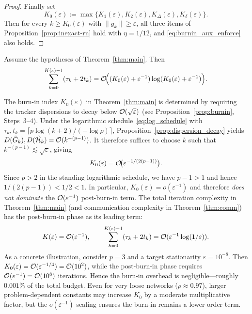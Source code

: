 \documentclass[review,onefignum,onetabnum]{siamart171218}
\begin{document}
\begin{proof}
\smallskip
Finally set
\[
K_0(\varepsilon):=\max\{K_1(\varepsilon),K_2(\varepsilon),K_\Delta(\varepsilon),K_\delta(\varepsilon)\}.
\]
Then for every $k\ge K_0(\varepsilon)$ with $\|g_k\|\ge \varepsilon$, all three items of Proposition~\ref{prop:inexact-rn} hold with $\eta=1/12$,
and \eqref{eq:burnin_aux_enforce} also holds.
\end{proof}

\begin{theorem}\label{thm:comm}
Assume the hypotheses of Theorem~\ref{thm:main}. Then
\[
\sum_{k=0}^{K(\varepsilon)-1}(\tau_k+2t_k)
=\mathcal{O}\!\Big((K_0(\varepsilon)+\varepsilon^{-1})\log(K_0(\varepsilon)+\varepsilon^{-1})\Big).
\]
\end{theorem}

\begin{remark}\label{rem:burnin_order_app}
The burn-in index $K_0(\varepsilon)$ in Theorem~\ref{thm:main} is
determined by requiring the tracker dispersions to decay below
$\mathcal{O}(\sqrt\varepsilon)$ (see Proposition~\ref{prop:burnin}, Steps~3--4).
Under the logarithmic schedule~\eqref{eq:log_schedule} with
$\tau_k,t_k=\lceil p\log(k+2)/(-\log\rho)\rceil$,
Proposition~\ref{prop:dispersion_decay} yields
$D(\tilde G_k),D(\tilde{\mathcal H}_k)=\mathcal{O}(k^{-(p-1)})$.
It therefore suffices to choose $k$ such that $k^{-(p-1)}\lesssim\sqrt\varepsilon$,
giving
\[
K_0(\varepsilon)=\mathcal{O}\!\big(\varepsilon^{-1/(2(p-1))}\big).
\]
Since $p>2$ in the standing logarithmic schedule, we have $p-1>1$
and hence $1/(2(p-1))<1/2<1$.
In particular, $K_0(\varepsilon)=o(\varepsilon^{-1})$ and therefore
\emph{does not dominate} the $\mathcal{O}(\varepsilon^{-1})$ post-burn-in term.
The total iteration complexity in Theorem~\ref{thm:main}
(and communication complexity in Theorem~\ref{thm:comm}) has the
post-burn-in phase as its leading term:
\[
K(\varepsilon)=\mathcal{O}(\varepsilon^{-1}),
\qquad
\sum_{k=0}^{K(\varepsilon)-1}(\tau_k+2t_k)
=\mathcal{O}(\varepsilon^{-1}\log(1/\varepsilon)).
\]
As a concrete illustration, consider $p=3$ and a target stationarity
$\varepsilon=10^{-8}$.
Then $K_0(\varepsilon)=\mathcal{O}(\varepsilon^{-1/4})=\mathcal{O}(10^{2})$,
while the post-burn-in phase requires $\mathcal{O}(\varepsilon^{-1})=\mathcal{O}(10^{8})$
iterations.
Hence the burn-in overhead is negligible---roughly $0.001\%$
of the total budget.
Even for very loose networks ($\rho\approx0.97$), larger
problem-dependent constants may increase $K_0$ by a moderate
multiplicative factor, but the $o(\varepsilon^{-1})$ scaling ensures
the burn-in remains a lower-order term.
\end{remark}
\end{document}
